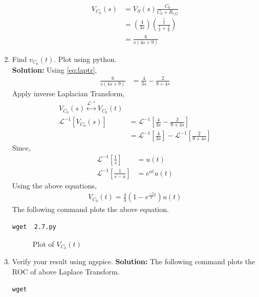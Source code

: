 \documentclass[journal,12pt,twocolumn]{IEEEtran}
\newcommand{\solution}{\noindent \textbf{Solution: }}
\providecommand{\brak}[1]{\ensuremath{\left(#1\right)}}
\providecommand{\system}[1]{\overset{\mathcal{#1}}{ \longleftrightarrow}}
\providecommand{\laplaceinv}[1]{{\mathcal{L}^{-1}\ensuremath{\left[#1\right]}}}
\numberwithin{equation}{section}
\renewcommand\thesection{\arabic{section}}
\begin{document}
\begin{enumerate}[label=\arabic*.,ref=\thesection.\theenumi]
\begin{align}
V_{C_0}(s)&=V_{S}(s)\frac{C_{0}}{C_{0}+R_{eff}}\\
&=\brak{\frac{4}{3s}}\brak{\frac{\frac{1}{s}}{\frac{1}{s}+\frac23}}\\
\label{eq:laptr}
&=\frac{6}{s\brak{4s+9}}
\end{align}
	\item Find $v_{C_0}(t)$.  Plot using python.\\
	\solution Using \eqref{eq:laptr},
	\begin{align}
	\frac{6}{s\brak{4s+9}}&=\frac{4}{3s}-\frac{2}{9+4s}
	\end{align}
	Apply inverse Laplacian Transform,
	\begin{align}
	V_{C_0}(s)\system{L^{-1}}V_{C_0}(t)\\
	\laplaceinv{V_{C_0}(s)}&=\laplaceinv{\frac{4}{3s}-\frac{2}{9+4s}}\\
&=	\laplaceinv{\frac{4}{3s}}-\laplaceinv{\frac{2}{9+4s}}
\end{align}
Since,
\begin{align}
\laplaceinv{\frac1s}&=u(t)\\
\laplaceinv{\frac{1}{s-a}}&=e^{at}u(t)
\end{align}
Using the above equations,
\begin{align}
V_{C_0}(t)=\frac{4}{3}\brak{ 1-e^{\frac{-3}{2} t}}u(t)
	\end{align}
	The following command plots the above equation.
	\begin{lstlisting}
wget  2.7.py	
\end{lstlisting}
	\begin{figure}[!ht]
			\centering
			\caption{Plot of $V_{C_0}(t)$}
\end{figure}
	\item Verify your result using ngspice.
	\solution The following command plots the ROC of above Laplace Transform.
	\begin{lstlisting}
wget 
\end{lstlisting}
\begin{figure}[!ht]
			\centering
			\caption{}
			\label{fig:ckt}
\end{figure}
\end{enumerate}
\end{document}
